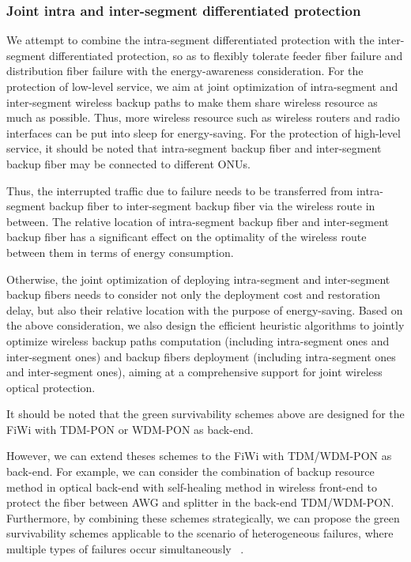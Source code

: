 \documentclass[conference,compsoc]{IEEEtran}
\begin{document}
\subsubsection{Joint intra and inter-segment differentiated protection}


We attempt to combine the intra-segment differentiated protection with the inter-segment 
differentiated protection, so as to flexibly tolerate feeder fiber failure and distribution fiber 
failure with the energy-awareness consideration. For the protection of low-level service, we aim at 
joint optimization of intra-segment and inter-segment wireless backup paths to make them share
wireless resource as much as possible. Thus, more wireless resource such as wireless routers and 
radio interfaces can be put into sleep for energy-saving. For the protection of high-level service, 
it should be noted that intra-segment backup fiber and inter-segment backup fiber may be connected 
to  different ONUs. 


Thus, the interrupted traffic due to failure needs to be transferred from intra-segment backup fiber 
to inter-segment backup fiber via the wireless route in between. The relative location of 
intra-segment backup fiber and inter-segment  backup fiber has a significant effect on the 
optimality of the wireless route between them in terms of energy consumption.

Otherwise, the joint optimization of deploying intra-segment and inter-segment backup fibers needs 
to consider not only the deployment cost and restoration delay, but also their relative location 
with the purpose of  energy-saving. Based on the above consideration, we  also design the 
efficient heuristic algorithms to jointly optimize wireless backup paths computation (including 
intra-segment ones and inter-segment ones) and backup fibers deployment (including  intra-segment 
ones and inter-segment ones), aiming at a comprehensive support for joint wireless optical 
protection.

It should be noted that the green survivability schemes above are designed for the FiWi 
with TDM-PON or WDM-PON as back-end. 


However, we can extend theses schemes  to the FiWi with TDM/WDM-PON as back-end. For example, we can 
consider the combination of backup resource method in optical back-end with self-healing method in 
wireless front-end to protect the fiber between AWG and splitter in the back-end TDM/WDM-PON. 
Furthermore, by combining these schemes strategically, we can propose the green survivability 
schemes applicable to the scenario of heterogeneous failures, where multiple types of failures occur 
simultaneously  ~\cite{Liu201268}.	  
\end{document}
